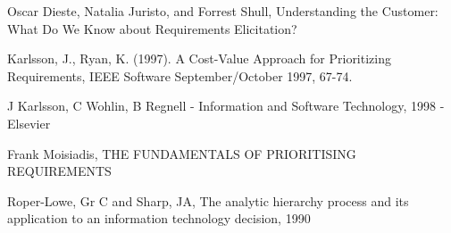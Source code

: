 \begin{thebibliography}{99}

Oscar Dieste, Natalia Juristo, and Forrest Shull, Understanding the Customer: What Do We Know about Requirements Elicitation?

Karlsson, J., Ryan, K. (1997). A Cost-Value Approach for Prioritizing Requirements, IEEE Software September/October 1997, 67-74.

J Karlsson, C Wohlin, B Regnell - Information and Software Technology, 1998 - Elsevier

Frank Moisiadis, THE FUNDAMENTALS OF PRIORITISING REQUIREMENTS

 Roper-Lowe, Gr C and Sharp, JA, The analytic hierarchy process and its application to an information technology decision, 1990

\end{thebibliography}